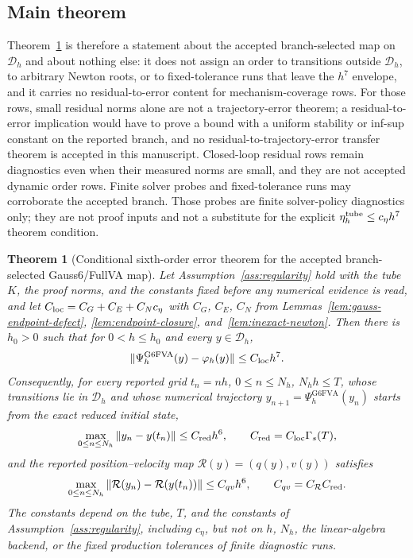 \documentclass[preprint,12pt]{elsarticle}
\newtheorem{theorem}{Theorem}
\newcommand{\method}{Gauss6\slash FullVA}
\begin{document}
\subsection{Main theorem}

Theorem~\ref{thm:g6fullva-order} is therefore a statement about the accepted
branch-selected map on $\mathcal D_h$ and about nothing else: it does not
assign an order to transitions outside $\mathcal D_h$, to arbitrary Newton
roots, or to fixed-tolerance runs that leave the $h^7$ envelope, and it
carries no residual-to-error content for mechanism-coverage rows. For those
rows, small residual norms alone are not a trajectory-error theorem; a
residual-to-error implication would have to prove a bound with a uniform
stability or inf-sup constant on the reported branch, and no
residual-to-trajectory-error transfer theorem is accepted in this
manuscript. Closed-loop residual rows remain diagnostics even when their
measured norms are small, and they are not accepted dynamic order rows.
Finite solver probes and fixed-tolerance runs may corroborate the accepted
branch. Those probes are finite solver-policy diagnostics only; they are not
proof inputs and not a substitute for the explicit
\(\eta_h^{\rm tube}\le c_\eta h^7\) theorem condition.

\begin{theorem}[Conditional sixth-order error theorem for the accepted branch-selected \method{} map]
\label{thm:g6fullva-order}
Let Assumption~\ref{ass:regularity} hold with the tube $K$, the proof norms,
and the constants fixed before any numerical evidence is read, and let
$C_{\rm loc}=C_G+C_E+C_Nc_\eta$ with $C_G$, $C_E$, $C_N$ from
Lemmas~\ref{lem:gauss-endpoint-defect}, \ref{lem:endpoint-closure},
and~\ref{lem:inexact-newton}. Then there is $h_0>0$ such that for
$0<h\le h_0$ and every $y\in\mathcal D_h$,
\begin{equation}
\label{eq:g6fva-local-defect-theorem}
  \|\Psi_h^{\mathrm{G6FVA}}(y)-\varphi_h(y)\|\le C_{\rm loc}h^7 .
\end{equation}
Consequently, for every reported grid $t_n=nh$, $0\le n\le N_h$, $N_hh\le T$,
whose transitions lie in $\mathcal D_h$ and whose numerical trajectory
$y_{n+1}=\Psi_h^{\mathrm{G6FVA}}(y_n)$ starts from the exact reduced initial
state,
\begin{equation}
\label{eq:g6fva-reduced-grid-bound}
  \max_{0\le n\le N_h}\|y_n-y(t_n)\|\le C_{\rm red}h^6,\qquad
  C_{\rm red}=C_{\rm loc}\Gamma_s(T),
\end{equation}
and the reported position--velocity map $\mathcal R(y)=(q(y),v(y))$ satisfies
\begin{equation}
\label{eq:g6fva-reported-grid-bound}
  \max_{0\le n\le N_h}\|\mathcal R(y_n)-\mathcal R(y(t_n))\|
  \le C_{qv}h^6,\qquad C_{qv}=C_{\mathcal R}C_{\rm red} .
\end{equation}
The constants depend on the tube, $T$, and the constants of
Assumption~\ref{ass:regularity}, including $c_\eta$, but not on $h$, $N_h$,
the linear-algebra backend, or the fixed production tolerances of finite
diagnostic runs.
\end{theorem}
\end{document}
